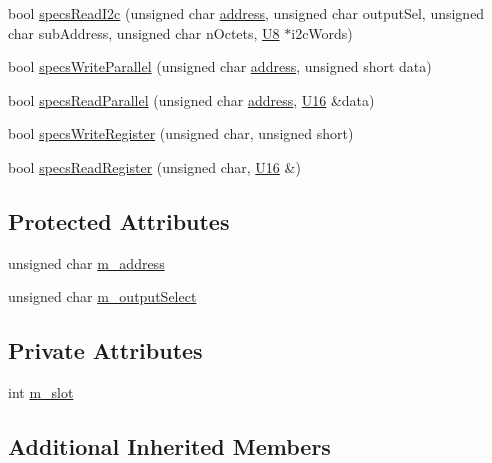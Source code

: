 \begin{DoxyCompactItemize}
bool \hyperlink{classSpecsInterface_ad27047eaae1bc333ee0c1a6c871a407b}{specs\+Read\+I2c} (unsigned char \hyperlink{classSpecsInterface_a0fa039a15b842a5ba783ce825b9915d8}{address}, unsigned char output\+Sel, unsigned char sub\+Address, unsigned char n\+Octets, \hyperlink{ICECALv3_8h_a3cb25ca6f51f003950f9625ff05536fc}{U8} $\ast$i2c\+Words)
\item 
bool \hyperlink{classSpecsInterface_a232c39e46091c493ad9d061428dd2a8b}{specs\+Write\+Parallel} (unsigned char \hyperlink{classSpecsInterface_a0fa039a15b842a5ba783ce825b9915d8}{address}, unsigned short data)
\item 
bool \hyperlink{classSpecsInterface_aefbe6b92a9f9e2f00bf41dd8b2605c05}{specs\+Read\+Parallel} (unsigned char \hyperlink{classSpecsInterface_a0fa039a15b842a5ba783ce825b9915d8}{address}, \hyperlink{ICECALv3_8h_adf928e51a60dba0df29d615401cc55a8}{U16} \&data)
\item 
bool \hyperlink{classSpecsInterface_ab70adfa5ad87097469c7485126a3c61a}{specs\+Write\+Register} (unsigned char, unsigned short)
\item 
bool \hyperlink{classSpecsInterface_a87080bb575d1b9d0bb313c48e7d3f59a}{specs\+Read\+Register} (unsigned char, \hyperlink{ICECALv3_8h_adf928e51a60dba0df29d615401cc55a8}{U16} \&)
\end{DoxyCompactItemize}
\subsection*{Protected Attributes}
\begin{DoxyCompactItemize}
\item 
unsigned char \hyperlink{classSpecsInterface_a4064da5ca6e0a172363967c4acc0b365}{m\+\_\+address}
\item 
unsigned char \hyperlink{classSpecsInterface_a660cb4112ce1c071f277cb6ec115b411}{m\+\_\+output\+Select}
\end{DoxyCompactItemize}
\subsection*{Private Attributes}
\begin{DoxyCompactItemize}
\item 
int \hyperlink{classSpecsInterface_a7030d3ba54c826b3524f72e57b82ece6}{m\+\_\+slot}
\end{DoxyCompactItemize}
\subsection*{Additional Inherited Members}


